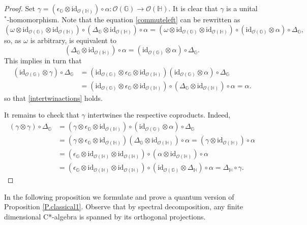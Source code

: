 \documentclass[12pt]{amsart}
\theoremstyle{definition}
\theoremstyle{definition}
\theoremstyle{definition}
\theoremstyle{definition}
\newcommand{\id}{\mathrm{id}}
\newcommand{\G}{\mathbb{G}}
\newcommand{\Hb}{\mathbb{H}}
\newcommand{\cO}{\mathcal{O}}
\numberwithin{equation}{section}
\begin{document}
\begin{proof}
Set $\gamma = (\epsilon_\G \otimes \id_{\cO(\Hb)}) \circ \alpha:\cO(\G) \to \cO(\Hb)$. It is clear that $\gamma$ is a unital $^*$-homomorphism.
Note that the equation \eqref{commuteleft} can be rewritten as
\[ (\omega \otimes \id_{\cO(\G)} \otimes \id_{\cO(\Hb)}) \circ (\Delta_\G \otimes \id_{\cO(\Hb)}) \circ \alpha = 
(\omega \otimes \id_{\cO(\G)} \otimes \id_{\cO(\Hb)}) \circ (\id_{\cO(\G)} \otimes \alpha) \circ \Delta_\G,\]
so, as $\omega$ is arbitrary, is equivalent to 
\begin{equation} \label{commuteleftglobal}
(\Delta_\G \otimes \id_{\cO(\Hb)}) \circ \alpha = 
 (\id_{\cO(\G)} \otimes \alpha) \circ \Delta_\G.
\end{equation}
This implies in turn that 
\begin{align*} (\id_{\cO(\G)} \otimes \gamma) \circ \Delta_\G  &=
(\id_{\cO(\G)} \otimes \epsilon_\G \otimes \id_{\cO(\Hb)}) (\id_{\cO(\G)}\otimes \alpha) \circ \Delta_\G \\&= (\id_{\cO(\G)} \otimes \epsilon_\G \otimes \id_{\cO(\Hb)}) \circ (\Delta_\G \otimes \id_{\cO(\Hb)}) \circ \alpha = \alpha.
\end{align*}
so that \eqref{intertwinactions} holds.

It remains to check that $\gamma$ intertwines the respective coproducts. Indeed,
\begin{align*} 
(\gamma \otimes \gamma) \circ \Delta_\G &= 
(\gamma \otimes \epsilon_\G \otimes \id_{\cO(\Hb)}) \circ (\id_{\cO(\G)} \otimes \alpha) \circ \Delta_\G \\&= (\gamma \otimes \epsilon_\G \otimes \id_{\cO(\Hb)}) 
(\Delta_\G \otimes \id_{\cO(\Hb)}) \circ \alpha = (\gamma \otimes \id_{\cO(\Hb)}) \circ \alpha \\&= 
(\epsilon_\G \otimes \id_{\cO(\Hb)} \otimes \id_{\cO(\Hb)}) \circ (\alpha \otimes \id_{\cO(\Hb)}) \circ \alpha \\&= (\epsilon_\G \otimes \id_{\cO(\Hb)} \otimes \id_{\cO(\Hb)}) \circ (\id_{\cO(\G)} \otimes \Delta_{\Hb}) \circ \alpha =
\Delta_{\Hb} \circ \gamma.
\end{align*} 


\end{proof}




In the following proposition we formulate and prove a quantum version of Proposition \ref{P.classical1}. Observe that by spectral decomposition, any finite dimensional C*-algebra is spanned by its orthogonal projections.
\end{document}
